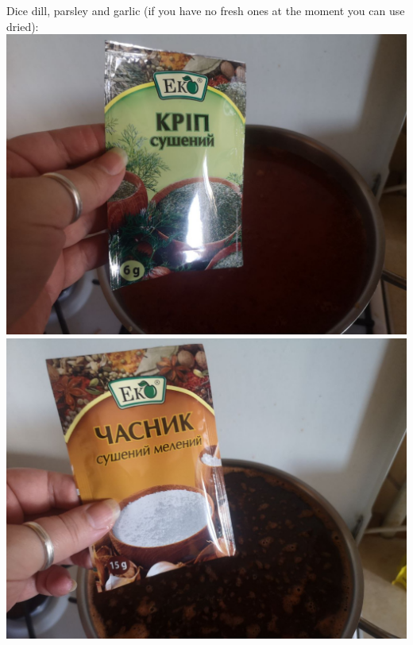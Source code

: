 \documentclass[11pt,a4paper]{article}
\begin{document}
Dice dill, parsley and garlic (if you have no fresh ones at the moment you can use dried): \\
\includegraphics[width=\textwidth]{16.jpg} \\
\includegraphics[width=\textwidth]{17.jpg} \\
\end{document}
